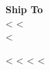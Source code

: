\parbox[t]{.55\textwidth}{
\textbf{Ship To} \\
 <%
<%
 \\
<%
}
\parbox[t]{.40\textwidth}{
\vspace*{0.5cm}  
<%
<%
<%
<%
}